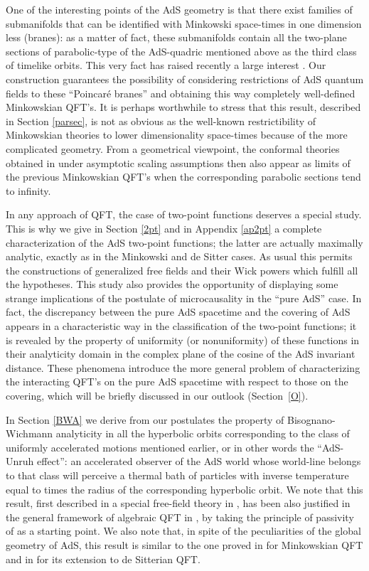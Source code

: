 \documentclass[a4paper,a4paper]{article}
\begin{document}
One of the interesting points of the AdS geometry is that
there
exist families of submanifolds that can be identified with Minkowski
space-times in one dimension less (branes): as a matter of fact,
these submanifolds contain all the
two-plane sections of parabolic-type of the AdS-quadric
mentioned above as the third class of timelike orbits.
This very fact has
raised recently a large interest \cite{maldacena,RS}. Our
construction guarantees the possibility of considering
restrictions of AdS quantum fields to these ``Poincar\'e branes'' and
obtaining this way completely well-defined Minkowskian QFT's. It
is perhaps worthwhile to stress that this result, described in
Section \ref{parsec}, is not as obvious as the well-known
restrictibility of Minkowskian theories to lower dimensionality
space-times because of the more complicated geometry.
{}From a geometrical viewpoint, the conformal theories obtained
in \cite{BBMS} under asymptotic scaling assumptions
then also appear as limits of the previous Minkowskian
QFT's when the corresponding parabolic sections tend to infinity.

In any approach of QFT, the case of two-point functions
deserves a special study.
This is why we give in Section \ref{2pt} and in Appendix \ref{ap2pt}
a  complete characterization of
the AdS two-point functions; the latter are actually maximally analytic,
exactly as in the Minkowski \cite{SW} and de Sitter \cite{BM,BEM}
cases. As usual this permits the constructions of generalized
free fields and their Wick powers which fulfill all the hypotheses.
This study also provides the opportunity of displaying
some strange implications of the postulate of microcausality
in the ``pure AdS'' case. In fact, the discrepancy between the pure
AdS spacetime and the covering of AdS appears in a
characteristic way in the classification of the two-point functions;
it is revealed by the property of uniformity (or nonuniformity) of these
functions in their
analyticity domain \coordHE{}  in the complex plane of the
cosine of the AdS invariant distance.
These phenomena introduce the more general problem of characterizing
the interacting QFT's
on the pure AdS spacetime with respect to those on the covering,
which will be briefly discussed in our outlook (Section~\ref{O}).

In Section \ref{BWA} we derive from our postulates
the property of Bisognano-Wichmann analyticity in
all the hyperbolic orbits corresponding to
the class of uniformly accelerated
motions mentioned earlier, or in other words the
``AdS-Unruh effect'':
an accelerated
observer of the AdS world whose world-line belongs to that class
will perceive a thermal bath of particles with inverse temperature
equal to \myHighlight{$2\pi$}\coordHE{} times the radius of the corresponding
hyperbolic orbit. We note that this result, first described
in a special free-field theory in \cite{Deser},
has been also justified in the general framework of
algebraic QFT
in \cite{BFS},
by taking the principle of passivity of \cite{PW}
as a starting point. We also note that,
in spite of the peculiarities of the global geometry of AdS,
this result is similar
to the one proved in
\cite{BW} for Minkowskian QFT
and in \cite{BEM} for its extension to de Sitterian QFT.
\end{document}
